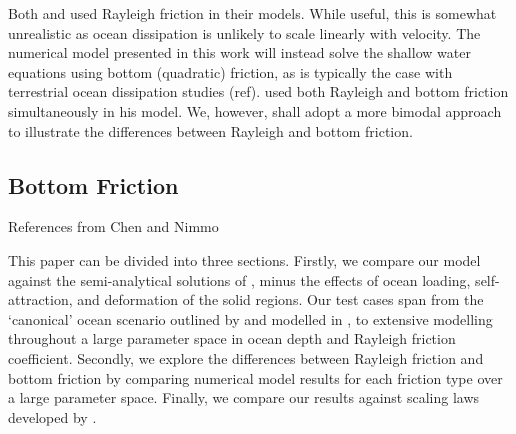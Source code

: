 Both \citet{tyler2011tidal} and \citet{matsuyama2014tidal} used Rayleigh friction in their models. While useful, this is somewhat unrealistic as ocean dissipation is unlikely to scale linearly with velocity. The numerical model presented in this work will instead solve the shallow water equations using bottom (quadratic) friction, as is typically the case with terrestrial ocean dissipation studies (ref). \citet{sears1995tidal} used both Rayleigh and bottom friction simultaneously in his model. We, however, shall adopt a more bimodal approach to illustrate the differences between Rayleigh and bottom friction. 

\subsection{Bottom Friction}

References from Chen and Nimmo


This paper can be divided into three sections. Firstly, we compare our model against the semi-analytical solutions of \citet{matsuyama2014tidal}, minus the effects of ocean loading, self-attraction, and deformation of the solid regions. Our test cases span from the `canonical' ocean scenario outlined by \citet{sagan1982tide} and modelled in \citet{sears1995tidal}, to extensive modelling throughout a large parameter space in ocean depth and Rayleigh friction coefficient. Secondly, we explore the differences between Rayleigh friction and bottom friction by comparing numerical model results for each friction type over a large parameter space. Finally, we compare our results against scaling laws developed by \citep{chen2013tidal}.




